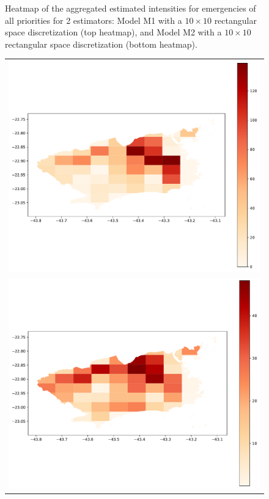 \documentclass[article]{jss}
\begin{document}
\begin{figure}
\begin{tabular}{c}
\end{tabular}
\caption{Heatmap of the aggregated estimated intensities for emergencies of all priorities for 2 estimators: Model M1 with a $10 \times 10$ rectangular space discretization (top heatmap), and Model M2 with a $10 \times 10$ rectangular space discretization (bottom heatmap).
\label{fig:heatmap1}}
\end{figure}

\begin{figure}
\centering
\begin{tabular}{c}
\includegraphics[scale=0.5]{heatP1Rect10x10_v3.pdf}\\
\includegraphics[scale=0.5]{heatCovP1Rect10x10_v3.pdf}

\end{tabular}
\end{figure}
\end{document}
